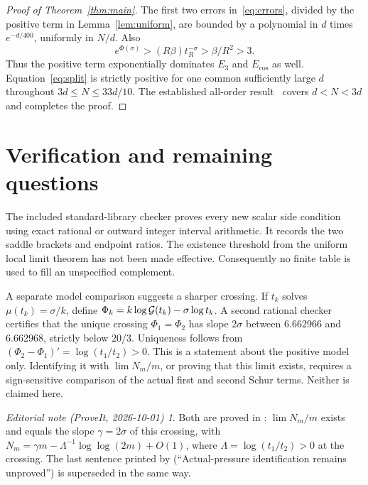\documentclass[11pt,a4paper]{article}
\theoremstyle{remark}\newtheorem*{ednote}{Editorial note (ProveIt, 2026-10-01)}
\begin{document}
\begin{proof}[Proof of Theorem~\ref{thm:main}]
The first two errors in~\eqref{eq:errors}, divided by the positive term in Lemma~\ref{lem:uniform}, are bounded by a polynomial in $d$ times $e^{-d/400}$, uniformly in $N/d$. Also
\[
 e^{\Phi(\sigma)}>(R\beta)t_R^{-\sigma}>\beta/R^2>3.
\]
Thus the positive term exponentially dominates $E_3$ and $E_{\cos}$ as well. Equation~\eqref{eq:split} is strictly positive for one common sufficiently large $d$ throughout $3d\le N\le33d/10$. The established all-order result~\cite{AllOrders} covers $d<N<3d$ and completes the proof.
\end{proof}

\section{Verification and remaining questions}
The included standard-library checker proves every new scalar side condition using exact rational or outward integer interval arithmetic. It records the two saddle brackets and endpoint ratios. The existence threshold from the uniform local limit theorem has not been made effective. Consequently no finite table is used to fill an unspecified complement.

A separate model comparison suggests a sharper crossing. If $t_k$ solves $\mu(t_k)=\sigma/k$, define $\Phi_k=k\log\mathcal G(t_k)-\sigma\log t_k$. A second rational checker certifies that the unique crossing $\Phi_1=\Phi_2$ has slope $2\sigma$ between $6.662966$ and $6.662968$, strictly below $20/3$. Uniqueness follows from $(\Phi_2-\Phi_1)'=\log(t_1/t_2)>0$. This is a statement about the positive model only. Identifying it with $\lim N_m/m$, or proving that this limit exists, requires a sign-sensitive comparison of the actual first and second Schur terms. Neither is claimed here.
\begin{ednote}
Both are proved in : $\lim N_m/m$ exists and equals the slope
$\gamma=2\sigma$ of this crossing, with $N_m=\gamma m-\Lambda^{-1}\log\log(2m)+O(1)$, where
$\Lambda=\log(t_1/t_2)>0$ at the crossing. The last sentence printed by
 (``Actual-pressure identification remains unproved'') is
superseded in the same way.
\end{ednote}
\end{document}
